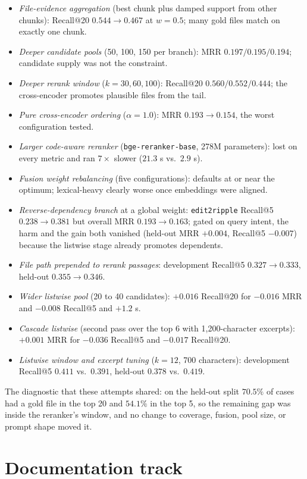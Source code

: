 \documentclass{article}
\begin{document}
\begin{itemize}[leftmargin=1.2em]
\item \emph{File-evidence aggregation} (best chunk plus damped support from other chunks): Recall@20 $0.544\to0.467$ at $w{=}0.5$; many gold files match on exactly one chunk.
\item \emph{Deeper candidate pools} (50, 100, 150 per branch): MRR $0.197/0.195/0.194$; candidate supply was not the constraint.
\item \emph{Deeper rerank window} ($k{=}30, 60, 100$): Recall@20 $0.560/0.552/0.444$; the cross-encoder promotes plausible files from the tail.
\item \emph{Pure cross-encoder ordering} ($\alpha{=}1.0$): MRR $0.193\to0.154$, the worst configuration tested.
\item \emph{Larger code-aware reranker} (\texttt{bge-reranker-base}, 278M parameters): lost on every metric and ran $7\times$ slower ($21.3$ s vs.\ $2.9$ s).
\item \emph{Fusion weight rebalancing} (five configurations): defaults at or near the optimum; lexical-heavy clearly worse once embeddings were aligned.
\item \emph{Reverse-dependency branch} at a global weight: \texttt{edit2ripple} Recall@5 $0.238\to0.381$ but overall MRR $0.193\to0.163$; gated on query intent, the harm and the gain both vanished (held-out MRR $+0.004$, Recall@5 $-0.007$) because the listwise stage already promotes dependents.
\item \emph{File path prepended to rerank passages}: development Recall@5 $0.327\to0.333$, held-out $0.355\to0.346$.
\item \emph{Wider listwise pool} (20 to 40 candidates): $+0.016$ Recall@20 for $-0.016$ MRR and $-0.008$ Recall@5 and $+1.2$ s.
\item \emph{Cascade listwise} (second pass over the top 6 with 1{,}200-character excerpts): $+0.001$ MRR for $-0.036$ Recall@5 and $-0.017$ Recall@20.
\item \emph{Listwise window and excerpt tuning} ($k{=}12$, 700 characters): development Recall@5 $0.411$ vs.\ $0.391$, held-out $0.378$ vs.\ $0.419$.
\end{itemize}
The diagnostic that these attempts shared: on the held-out split $70.5\%$ of cases had a gold file in the top 20 and $54.1\%$ in the top 5, so the remaining gap was inside the reranker's window, and no change to coverage, fusion, pool size, or prompt shape moved it.

\section{Documentation track}
\label{app:docs}
\end{document}
